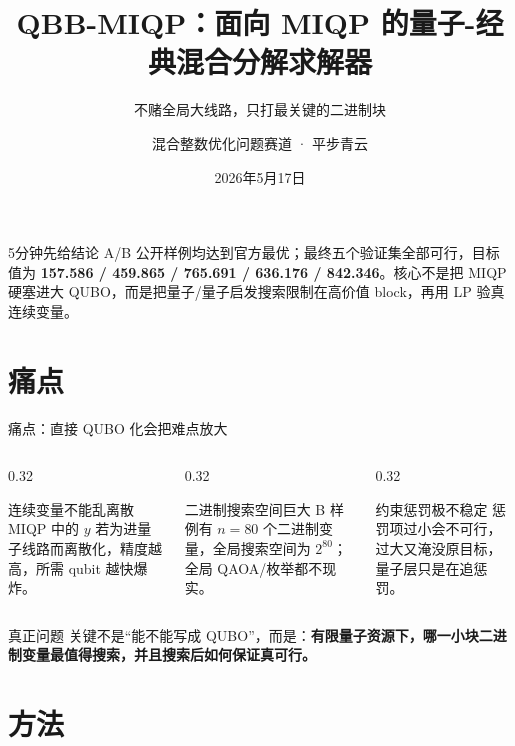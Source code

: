 \documentclass[aspectratio=169]{beamer}
\title[QBB-MIQP 路演]{QBB-MIQP：面向 MIQP 的量子-经典混合分解求解器}
\subtitle{不赌全局大线路，只打最关键的二进制块}
\author[平步青云]{混合整数优化问题赛道 · 平步青云}
\institute[Quantum MIQP]{Quantum Block-Benders for Mixed-Integer Quadratic Programming}
\date{2026年5月17日}
\begin{document}
\begin{frame}
 \titlepage
 \vspace{-7mm}
 \begin{alertblock}{5分钟先给结论}
 \scriptsize A/B 公开样例均达到官方最优；最终五个验证集全部可行，目标值为 \textbf{157.586 / 459.865 / 765.691 / 636.176 / 842.346}。核心不是把 MIQP 硬塞进大 QUBO，而是把量子/量子启发搜索限制在高价值 block，再用 LP 验真连续变量。
 \end{alertblock}
\end{frame}

\section{痛点}

\begin{frame}{痛点：直接 QUBO 化会把难点放大}
\small
\begin{columns}[T,onlytextwidth]
\begin{column}{0.32\textwidth}
\begin{block}{连续变量不能乱离散}
MIQP 中的 $y$ 若为进量子线路而离散化，精度越高，所需 qubit 越快爆炸。
\end{block}
\end{column}
\begin{column}{0.32\textwidth}
\begin{block}{二进制搜索空间巨大}
B 样例有 $n=80$ 个二进制变量，全局搜索空间为 $2^{80}$；全局 QAOA/枚举都不现实。
\end{block}
\end{column}
\begin{column}{0.32\textwidth}
\begin{block}{约束惩罚极不稳定}
惩罚项过小会不可行，过大又淹没原目标，量子层只是在追惩罚。
\end{block}
\end{column}
\end{columns}

\vspace{3mm}
\begin{alertblock}{真正问题}
关键不是“能不能写成 QUBO”，而是：\textbf{有限量子资源下，哪一小块二进制变量最值得搜索，并且搜索后如何保证真可行。}
\end{alertblock}
\end{frame}

\section{方法}
\end{document}
